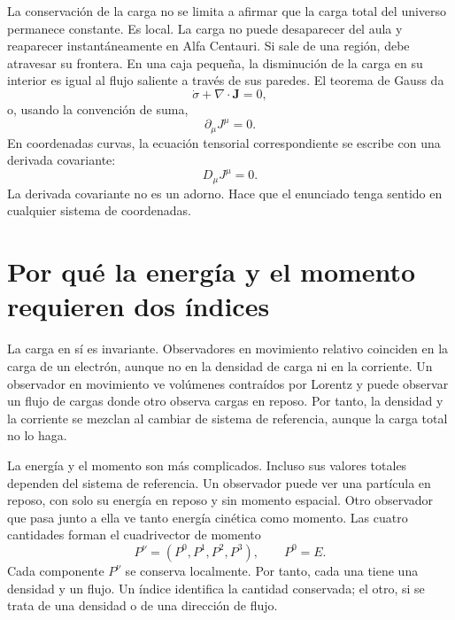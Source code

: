 La conservación de la carga no se limita a afirmar que la carga total del universo permanece constante. Es local. La carga no puede desaparecer del aula y reaparecer instantáneamente en Alfa Centauri. Si sale de una región, debe atravesar su frontera. En una caja pequeña, la disminución de la carga en su interior es igual al flujo saliente a través de sus paredes. El teorema de Gauss da
\begin{equation}
 \dot{\sigma}+\nabla\cdot\mathbf{J}=0,
\end{equation}
o, usando la convención de suma,
\begin{equation}
 \partial_\mu J^\mu=0.
 \label{eq:charge-continuity}
\end{equation}
En coordenadas curvas, la ecuación tensorial correspondiente se escribe con una derivada covariante:
\begin{equation}
 D_\mu J^\mu=0.
\end{equation}
La derivada covariante no es un adorno. Hace que el enunciado tenga sentido en cualquier sistema de coordenadas.

\section{Por qué la energía y el momento requieren dos índices}

La carga en sí es invariante. Observadores en movimiento relativo coinciden en la carga de un electrón, aunque no en la densidad de carga ni en la corriente. Un observador en movimiento ve volúmenes contraídos por Lorentz y puede observar un flujo de cargas donde otro observa cargas en reposo. Por tanto, la densidad y la corriente se mezclan al cambiar de sistema de referencia, aunque la carga total no lo haga.

La energía y el momento son más complicados. Incluso sus valores totales dependen del sistema de referencia. Un observador puede ver una partícula en reposo, con solo su energía en reposo y sin momento espacial. Otro observador que pasa junto a ella ve tanto energía cinética como momento. Las cuatro cantidades forman el cuadrivector de momento
\begin{equation}
 P^\nu=(P^0,P^1,P^2,P^3),
 \qquad P^0=E.
\end{equation}
Cada componente \(P^\nu\) se conserva localmente. Por tanto, cada una tiene una densidad y un flujo. Un índice identifica la cantidad conservada; el otro, si se trata de una densidad o de una dirección de flujo.


